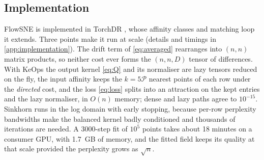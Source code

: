 \subsection{Implementation}
\label{sec:implementation}

FlowSNE is implemented in TorchDR \citep{vanassel2025torchdr}, whose
affinity classes and matching loop it extends. Three points make it run
at scale (details and timings in \cref{app:implementation}). The drift
term of \eqref{eq:averaged} rearranges into $(n,n)$ matrix products, so
neither cost ever forms the $(n,n,D)$ tensor of differences. With KeOps
\citep{charlier2021keops} the output kernel \eqref{eq:Q} and its
normaliser are lazy tensors reduced on the fly, the input affinity keeps
the $k=5\mathcal P$ nearest points of each row under the \emph{directed}
cost, and the loss \eqref{eq:loss} splits into an attraction on the kept
entries and the lazy normaliser, in $O(n)$ memory; dense and lazy paths
agree to $10^{-15}$. Sinkhorn runs in the log domain with early stopping,
because per-row perplexity bandwidths make the balanced kernel badly
conditioned and thousands of iterations are needed. A 3000-step fit of
$10^5$ points takes about 18 minutes on a consumer GPU, with 1.7~GB of
memory, and the fitted field keeps its quality at that scale provided the
perplexity grows as $\sqrt n$.
